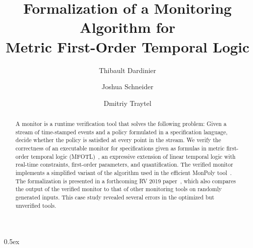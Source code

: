 \documentclass[10pt,a4paper]{article}
\begin{document}
\title{Formalization of a Monitoring Algorithm for\\ Metric First-Order Temporal Logic}
\author{Thibault Dardinier \and Joshua Schneider \and Dmitriy Traytel}

\maketitle

\begin{abstract} A monitor is a runtime verification tool that solves the following
problem: Given a stream of time-stamped events and a policy formulated in a specification
language, decide whether the policy is satisfied at every point in the stream. We verify
the correctness of an executable monitor for specifications given as formulas in metric
first-order temporal logic (MFOTL)~\cite{BasinKMZ-JACM15}, an expressive extension of
linear temporal logic with real-time constraints, first-order parameters, and
quantification. The verified monitor implements a simplified variant of the algorithm
used in the efficient MonPoly tool~\cite{monpoly}. The formalization is presented in a
forthcoming RV 2019 paper~\cite{SchneiderBKT-RV19}, which also compares the output of the
verified monitor to that of other monitoring tools on randomly generated inputs. This
case study revealed several errors in the optimized but unverified tools. \end{abstract}

\tableofcontents

\parindent 0pt\parskip 0.5ex





\end{document}
